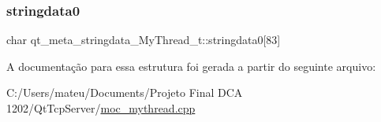\subsubsection{\texorpdfstring{stringdata0}{stringdata0}}
{\footnotesize\ttfamily char qt\+\_\+meta\+\_\+stringdata\+\_\+\+My\+Thread\+\_\+t\+::stringdata0\mbox{[}83\mbox{]}}



A documentação para essa estrutura foi gerada a partir do seguinte arquivo\+:\begin{DoxyCompactItemize}
\item 
C\+:/\+Users/mateu/\+Documents/\+Projeto Final D\+C\+A 1202/\+Qt\+Tcp\+Server/\mbox{\hyperlink{moc__mythread_8cpp}{moc\+\_\+mythread.\+cpp}}\end{DoxyCompactItemize}
